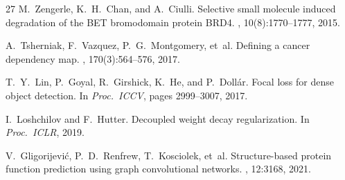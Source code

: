 \documentclass[sigconf]{acmart}
\begin{document}
\begin{thebibliography}{27}
M.~Zengerle, K.~H.~Chan, and A.~Ciulli.
\newblock Selective small molecule induced degradation of the {BET} bromodomain protein {BRD4}.
, 10(8):1770--1777, 2015.

A.~Tsherniak, F.~Vazquez, P.~G.~Montgomery, et~al.
\newblock Defining a cancer dependency map.
, 170(3):564--576, 2017.

T.~Y.~Lin, P.~Goyal, R.~Girshick, K.~He, and P.~Doll\'{a}r.
\newblock Focal loss for dense object detection.
\newblock In {\em Proc.\ ICCV}, pages 2999--3007, 2017.

I.~Loshchilov and F.~Hutter.
\newblock Decoupled weight decay regularization.
\newblock In {\em Proc.\ ICLR}, 2019.

V.~Gligorijevi\'{c}, P.~D.~Renfrew, T.~Kosciolek, et~al.
\newblock Structure-based protein function prediction using graph convolutional networks.
, 12:3168, 2021.

\end{thebibliography}
\end{document}
